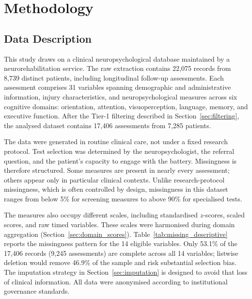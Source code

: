 
\chapter{Methodology}\label{Chapter3}


\section{Data Description}

This study draws on a clinical neuropsychological database maintained by a neurorehabilitation service. The raw extraction contains 22,075 records from 8,739 distinct patients, including longitudinal follow-up assessments. Each assessment comprises 31 variables spanning demographic and administrative information, injury characteristics, and neuropsychological measures across six cognitive domains: orientation, attention, visuoperception, language, memory, and executive function. After the Tier-1 filtering described in Section~\ref{sec:filtering}, the analysed dataset contains 17{,}406 assessments from 7{,}285 patients.

The data were generated in routine clinical care, not under a fixed research protocol. Test selection was determined by the neuropsychologist, the referral question, and the patient's capacity to engage with the battery. Missingness is therefore structured. Some measures are present in nearly every assessment; others appear only in particular clinical contexts. Unlike research-protocol missingness, which is often controlled by design, missingness in this dataset ranges from below 5\% for screening measures to above 90\% for specialised tests.

The measures also occupy different scales, including standardised $z$-scores, scaled scores, and raw timed variables. These scales were harmonised during domain aggregation (Section~\ref{sec:domain_scores}). Table~\ref{tab:missing_descriptive} reports the missingness pattern for the 14 eligible variables. Only 53.1\% of the 17,406 records (9,245 assessments) are complete across all 14 variables; listwise deletion would remove 46.9\% of the sample and risk substantial selection bias. The imputation strategy in Section~\ref{sec:imputation} is designed to avoid that loss of clinical information. All data were anonymised according to institutional governance standards.


